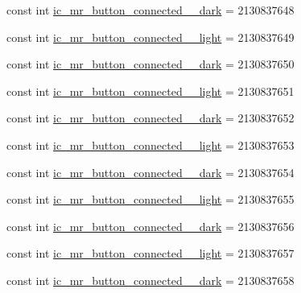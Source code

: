 \begin{DoxyCompactItemize}
const int \mbox{\hyperlink{class_f_w_p_s___app_1_1_droid_1_1_resource_1_1_drawable_ace751c88aa4e7cf7e66a15f5e719f865}{ic\+\_\+mr\+\_\+button\+\_\+connected\+\_\+\_\+dark}} = 2130837648
\item 
const int \mbox{\hyperlink{class_f_w_p_s___app_1_1_droid_1_1_resource_1_1_drawable_a3bae786a4a17ac6e18d167ac6beda230}{ic\+\_\+mr\+\_\+button\+\_\+connected\+\_\+\_\+light}} = 2130837649
\item 
const int \mbox{\hyperlink{class_f_w_p_s___app_1_1_droid_1_1_resource_1_1_drawable_a3002999623e6730ba2071d66ffea5043}{ic\+\_\+mr\+\_\+button\+\_\+connected\+\_\+\_\+dark}} = 2130837650
\item 
const int \mbox{\hyperlink{class_f_w_p_s___app_1_1_droid_1_1_resource_1_1_drawable_adf45b92892a0b2d09b3bb09bf33a64a0}{ic\+\_\+mr\+\_\+button\+\_\+connected\+\_\+\_\+light}} = 2130837651
\item 
const int \mbox{\hyperlink{class_f_w_p_s___app_1_1_droid_1_1_resource_1_1_drawable_a6f565a29fec428291e79b7dd0103c4ca}{ic\+\_\+mr\+\_\+button\+\_\+connected\+\_\+\_\+dark}} = 2130837652
\item 
const int \mbox{\hyperlink{class_f_w_p_s___app_1_1_droid_1_1_resource_1_1_drawable_a761d5efa582552d669b78d51fcecfeec}{ic\+\_\+mr\+\_\+button\+\_\+connected\+\_\+\_\+light}} = 2130837653
\item 
const int \mbox{\hyperlink{class_f_w_p_s___app_1_1_droid_1_1_resource_1_1_drawable_add73b329ed63b3d3f37ba33f84d95ff0}{ic\+\_\+mr\+\_\+button\+\_\+connected\+\_\+\_\+dark}} = 2130837654
\item 
const int \mbox{\hyperlink{class_f_w_p_s___app_1_1_droid_1_1_resource_1_1_drawable_a07ffe8fcc7bf14c4c24dcffa0ae965be}{ic\+\_\+mr\+\_\+button\+\_\+connected\+\_\+\_\+light}} = 2130837655
\item 
const int \mbox{\hyperlink{class_f_w_p_s___app_1_1_droid_1_1_resource_1_1_drawable_af8a347f01d8fd49c302c3fc3fb7f11b6}{ic\+\_\+mr\+\_\+button\+\_\+connected\+\_\+\_\+dark}} = 2130837656
\item 
const int \mbox{\hyperlink{class_f_w_p_s___app_1_1_droid_1_1_resource_1_1_drawable_a462c31d0dbb560824bd3b63fad0a2b5c}{ic\+\_\+mr\+\_\+button\+\_\+connected\+\_\+\_\+light}} = 2130837657
\item 
const int \mbox{\hyperlink{class_f_w_p_s___app_1_1_droid_1_1_resource_1_1_drawable_a849b55bf3135a02fb141073cb7bc19ce}{ic\+\_\+mr\+\_\+button\+\_\+connected\+\_\+\_\+dark}} = 2130837658
\item 

\end{DoxyCompactItemize}
